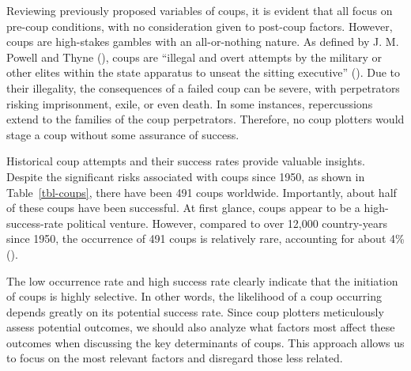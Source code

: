 \documentclass[
  12pt,
]{report}
\begin{document}
Reviewing previously proposed variables of coups, it is evident that all
focus on pre-coup conditions, with no consideration given to post-coup
factors. However, coups are high-stakes gambles with an all-or-nothing
nature. As defined by J. M. Powell and Thyne
(), coups are ``illegal and overt
attempts by the military or other elites within the state apparatus to
unseat the sitting executive'' (). Due to their illegality, the consequences of a
failed coup can be severe, with perpetrators risking imprisonment,
exile, or even death. In some instances, repercussions extend to the
families of the coup perpetrators. Therefore, no coup plotters would
stage a coup without some assurance of success.

Historical coup attempts and their success rates provide valuable
insights. Despite the significant risks associated with coups since
1950, as shown in Table~\ref{tbl-coups}, there have been 491 coups
worldwide. Importantly, about half of these coups have been successful.
At first glance, coups appear to be a high-success-rate political
venture. However, compared to over 12,000 country-years since 1950, the
occurrence of 491 coups is relatively rare, accounting for about 4\%
().

The low occurrence rate and high success rate clearly indicate that the
initiation of coups is highly selective. In other words, the likelihood
of a coup occurring depends greatly on its potential success rate. Since
coup plotters meticulously assess potential outcomes, we should also
analyze what factors most affect these outcomes when discussing the key
determinants of coups. This approach allows us to focus on the most
relevant factors and disregard those less related.

\begingroup
\setlength{}
\setlength{}\fontsize{12.0pt}{14.4pt}\selectfont
\setlength{\LTpost}{0mm}
\end{document}
